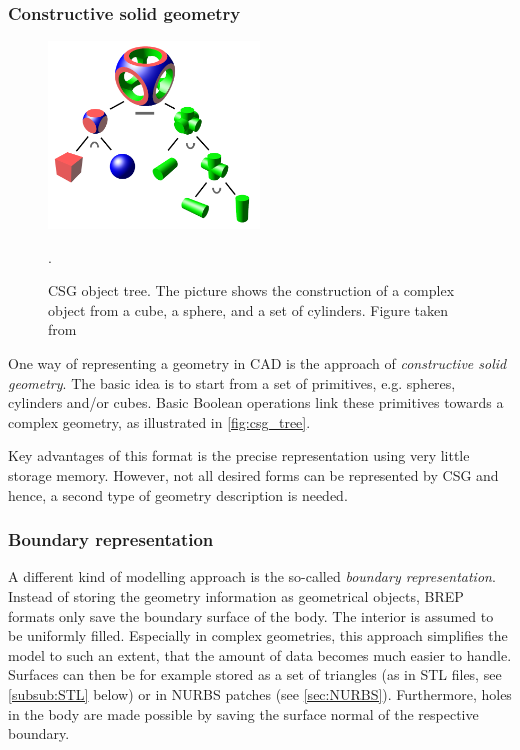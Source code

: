 \subsubsection{Constructive solid geometry}
\begin{figure}
\centering
\includegraphics[width=0.5\textwidth]{Pictures/Csg_tree.png}
\caption{CSG object tree. The picture shows the construction of a complex object from a cube, a sphere, and a set of cylinders. Figure taken from \cite{WikipediaCSG}}.
\label{fig:csg_tree}
\end{figure}
One way of representing a geometry in CAD is the approach of \emph{constructive solid geometry}. The basic idea is to start from a set of primitives, e.g. spheres, cylinders and/or cubes. Basic Boolean operations link these primitives towards a complex geometry, as illustrated in \autoref{fig:csg_tree}.

Key advantages of this format is the precise representation using very little storage memory. However, not all desired forms can be represented by CSG and hence, a second type of geometry description is needed. 
\subsubsection{Boundary representation}
A different kind of modelling approach is the so-called \emph{boundary representation}. Instead of storing the geometry information as geometrical objects, BREP formats only save the boundary surface of the body. The interior is assumed to be uniformly filled. Especially in complex geometries, this approach simplifies the model to such an extent, that the amount of data becomes much easier to handle. Surfaces can then be for example stored as a set of triangles (as in STL files, see \autoref{subsub:STL} below) or in NURBS patches (see \autoref{sec:NURBS}).
Furthermore, holes in the body are made possible by saving the surface normal of the respective boundary. 

